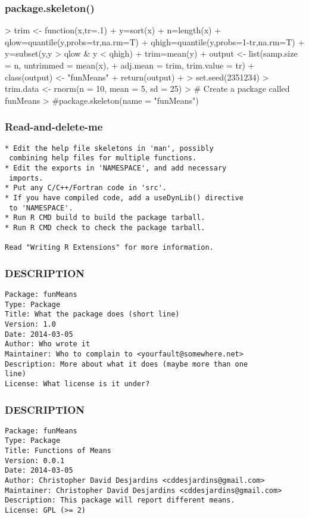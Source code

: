 \documentclass[xcolor=svgnames]{beamer}
\begin{document}
\begin{frame}[fragile]
  \frametitle{package.skeleton()}
\begin{Schunk}
\begin{Sinput}
> trim <- function(x,tr=.1){
+     y=sort(x)
+     n=length(x)
+     qlow=quantile(y,probs=tr,na.rm=T)
+     qhigh=quantile(y,probs=1-tr,na.rm=T)
+     y=subset(y,y > qlow & y < qhigh)
+     trim=mean(y)
+     output <- list(samp.size = n, untrimmed = mean(x),
+                    adj.mean = trim, trim.value = tr)
+     class(output) <- "funMeans"
+     return(output)
+ } 
> set.seed(2351234)
> trim.data <- rnorm(n = 10, mean = 5, sd = 25)                                   
> # Create a package called funMeans
> #package.skeleton(name = "funMeans")  
\end{Sinput}
\end{Schunk}

\end{frame}

\begin{frame}[fragile]
  \frametitle{Read-and-delete-me}
  \begin{verbatim}
* Edit the help file skeletons in 'man', possibly
 combining help files for multiple functions.
* Edit the exports in 'NAMESPACE', and add necessary
 imports.
* Put any C/C++/Fortran code in 'src'.
* If you have compiled code, add a useDynLib() directive
 to 'NAMESPACE'.
* Run R CMD build to build the package tarball.
* Run R CMD check to check the package tarball.

Read "Writing R Extensions" for more information.
\end{verbatim}
\end{frame}

\begin{frame}[fragile]
\frametitle{DESCRIPTION}
\begin{verbatim}
Package: funMeans
Type: Package
Title: What the package does (short line)
Version: 1.0
Date: 2014-03-05
Author: Who wrote it
Maintainer: Who to complain to <yourfault@somewhere.net>
Description: More about what it does (maybe more than one
line)
License: What license is it under?
\end{verbatim}
\end{frame}

\begin{frame}[fragile]
\frametitle{DESCRIPTION}
\begin{footnotesize}
\begin{verbatim}
Package: funMeans
Type: Package
Title: Functions of Means
Version: 0.0.1
Date: 2014-03-05
Author: Christopher David Desjardins <cddesjardins@gmail.com>
Maintainer: Christopher David Desjardins <cddesjardins@gmail.com>
Description: This package will report different means.
License: GPL (>= 2)
\end{verbatim}
\end{footnotesize}
\end{frame}
\end{document}
